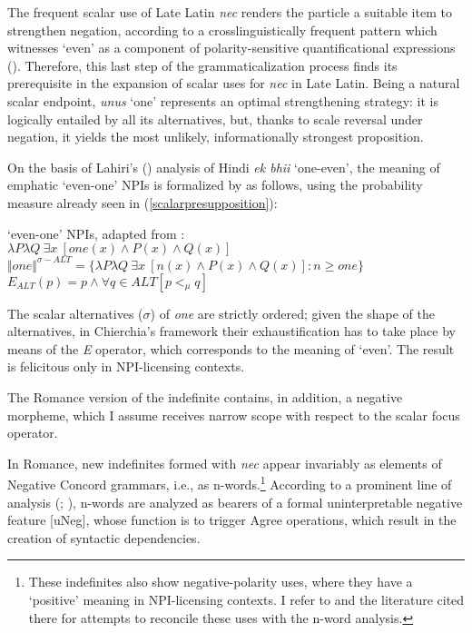 \documentclass[output=paper,modfonts,nonflat,citecolor=brown,
showindex
]{langsci/langscibook}
\begin{document}
The frequent scalar use of Late Latin {\emph{nec}} renders the particle a suitable item to strengthen negation, according to a crosslinguistically frequent pattern which witnesses `even' as a component of polarity-sensitive quantificational expressions (\citealt[]{Haspelmath97, Lahiri98, Watanabe04, Chierchia13}). Therefore, this last step of the grammaticalization process finds its prerequisite in the expansion of scalar uses for {\emph{nec}} in Late Latin. Being a natural scalar endpoint, {\emph{unus}} `one' represents an optimal strengthening strategy: it is logically entailed by all its alternatives, but, thanks to scale reversal under negation, it yields the most unlikely, informationally strongest proposition.

On the basis of Lahiri's (\citeyear{Lahiri98}) analysis of Hindi {\emph{ek bhii}} `one-even', the meaning of emphatic `even-one' NPIs is formalized by \citet[156]{Chierchia13} as follows, using the probability measure already seen in (\ref{scalarpresupposition}):

{\begin{exe}
\ex
\begin{xlist}
\ex \label{evenoneNPIChierchia} `even-one' NPIs, adapted from \citet[156]{Chierchia13}:\\
$\lambda P \lambda Q \ \exists x \ [one(x) \wedge P(x) \wedge Q(x) ]$\\
$\Vert one \Vert^{\sigma-ALT} = \{ \lambda P \lambda Q \ \exists x \ [n(x) \wedge P(x) \wedge Q(x)]: n \geq one \}$
\ex $ E_{ALT}(p) = p \wedge \forall q \in ALT [p <_{\mu} q]$
\end{xlist}
\end{exe}}

\noindent The scalar alternatives ($\sigma$) of {\emph{one}} are strictly ordered; given the shape of the alternatives, in Chierchia's framework their exhaustification has to take place by means of the {\emph{E}} operator, which corresponds to the meaning of `even'. The result is felicitous only in NPI-licensing contexts.

The Romance version of the indefinite contains, in addition, a negative morpheme, which I assume receives narrow scope with respect to the scalar focus operator.

In Romance, new indefinites formed with {\emph{nec}} appear invariably as elements of Negative Concord grammars, i.e., as n-words.{\footnote{These indefinites also show negative-polarity uses, where they have a `positive' meaning in NPI-licensing contexts. I refer to \citet[chapter 5]{Gianollo18} and the literature cited there for attempts to reconcile these uses with the n-word analysis.}}
According to a prominent line of analysis (\citealt[]{Zeijlstra04, Zeijlstra14}; \citealt[]{Penka11}), n-words are analyzed as bearers of a formal uninterpretable negative feature [uNeg], whose function is to trigger Agree operations, which result in the creation of syntactic dependencies.
\end{document}
